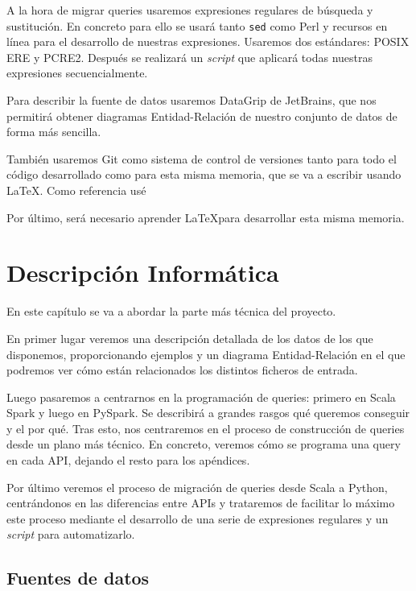 \documentclass[12pt,twoside,titlepage]{report}
\begin{document}
A la hora de migrar queries usaremos expresiones regulares de búsqueda y sustitución. En concreto para ello se usará tanto \texttt{sed} como Perl y recursos en línea para el desarrollo de nuestras expresiones. Usaremos dos estándares: POSIX ERE y PCRE2. Después se realizará un \textit{script} que aplicará todas nuestras expresiones secuencialmente.

Para describir la fuente de datos usaremos DataGrip de JetBrains, que nos permitirá obtener diagramas Entidad-Relación de nuestro conjunto de datos de forma más sencilla.

También usaremos Git como sistema de control de versiones tanto para todo el código desarrollado como para esta misma memoria, que se va a escribir usando \LaTeX. Como referencia usé \cite{git}

Por último, será necesario aprender \LaTeX para desarrollar esta misma memoria.



\chapter{Descripción Informática}
\label{chap:contenidos}
\newpage

En este capítulo se va a abordar la parte más técnica del proyecto. 

En primer lugar veremos una descripción detallada de los datos de los que disponemos, proporcionando ejemplos y un diagrama Entidad-Relación en el que podremos ver cómo están relacionados los distintos ficheros de entrada.

Luego pasaremos a centrarnos en la programación de queries: primero en Scala Spark y luego en PySpark. Se describirá a grandes rasgos qué queremos conseguir y el por qué. Tras esto, nos centraremos en el proceso de construcción de queries desde un plano más técnico. En concreto, veremos cómo se programa una query en cada API, dejando el resto para los apéndices.

Por último veremos el proceso de migración de queries desde Scala a Python, centrándonos en las diferencias entre APIs y trataremos de facilitar lo máximo este proceso mediante el desarrollo de una serie de expresiones regulares y un \textit{script} para automatizarlo.

\section{Fuentes de datos}
\end{document}
